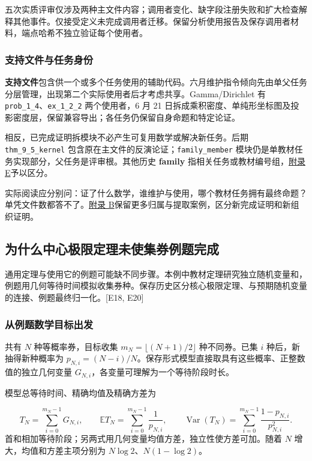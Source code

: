 五次实质评审仅涉及两种主文件内容；调用者变化、缺字段注册失败和扩大检查解释其他事件。仅接受定义未完成调用者迁移。保留分析使用报告及保存调用者材料，端点哈希不独立验证每个使用者。

\subsubsection[支持文件与任务身份]{\texorpdfstring{\protect\hypertarget{l2-5}{}支持文件与任务身份}{支持文件与任务身份}}
\textbf{支持文件}包含供一个或多个任务使用的辅助代码。六月维护指令倾向先由单父任务分层管理，出现第二个实际使用者后才考虑共享。Gamma/Dirichlet 有 \nolinkurl{prob_1_4}、\nolinkurl{ex_1_2_2} 两个使用者，6 月 21 日拆成乘积密度、单纯形坐标图及投影密度层，保留兼容导出；各任务仍保留自身命题和特定论证。

相反，已完成证明拆模块不必产生可复用数学或解决新任务。后期 \nolinkurl{thm_9_5_kernel} 包含原在主文件的反演论证；\nolinkurl{family_member} 模块仍是单教材任务实现部分，父任务是评审根。其他历史 \textbf{family} 指相关任务或教材编号组，\hyperlink{appendix-e}{附录 E}予以区分。

实际阅读应分别问：证了什么数学，谁维护与使用，哪个教材任务拥有最终命题？单凭文件数都答不了。\hyperlink{appendix-b}{附录 B}保留更多归属与提取案例，区分新完成证明和新组织证明。

\subsection[为什么中心极限定理未使集券例题完成]{\texorpdfstring{\protect\hypertarget{l3}{}为什么中心极限定理未使集券例题完成}{为什么中心极限定理未使集券例题完成}}
通用定理与使用它的例题可能缺不同步骤。本例中教材定理研究独立随机变量和，例题用几何等待时间模拟收集券种。保存历史区分核心极限定理、与预期随机变量的连接、例题最终归一化。[E18, E20]

\subsubsection[从例题数学目标出发]{\texorpdfstring{\protect\hypertarget{l3-1}{}从例题数学目标出发}{从例题数学目标出发}}
共有 $N$ 种等概率券，目标收集 $m_N=\lfloor(N+1)/2\rfloor$ 种不同券。已集 $i$ 种后，新抽得新种概率为 $p_{N,i}=(N-i)/N$。保存形式模型直接取具有这些概率、正整数值的独立几何变量 $G_{N,i}$，各变量可理解为一个等待阶段时长。

模型总等待时间、精确均值及精确方差为

\[
T_N=\sum_{i=0}^{m_N-1}G_{N,i},\qquad
\mathbb E T_N=\sum_{i=0}^{m_N-1}\frac{1}{p_{N,i}},\qquad
\operatorname{Var}(T_N)=\sum_{i=0}^{m_N-1}\frac{1-p_{N,i}}{p_{N,i}^2}.
\]
首和相加等待阶段；另两式用几何变量均值方差，独立性使方差可加。随着 $N$ 增大，均值和方差主项分别为 $N\log2$、$N(1-\log2)$。

